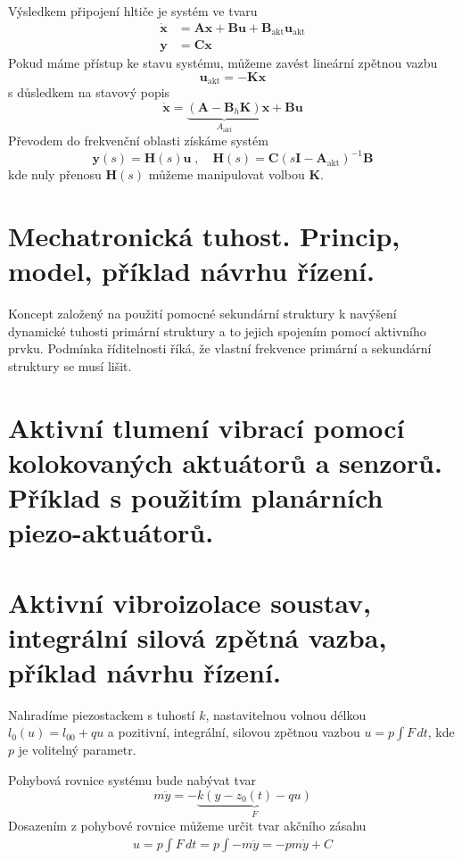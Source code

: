 \documentclass{article}
\begin{document}
	Výsledkem připojení hltiče je systém ve tvaru
	\begin{align}
		\bm{\dot{x}} &= \bm{A}\bm{x} + \bm{B}\bm{u} + \bm{B}_\text{akt} \bm{u}_\text{akt} \\
		\bm{y} &= \bm{C}\bm{x}
	\end{align}
	Pokud máme přístup ke stavu systému, můžeme zavést lineární zpětnou vazbu
	\begin{equation}
		\bm{u}_\text{akt} = -\bm{K}\bm{x}
	\end{equation}
	s důsledkem na stavový popis
	\begin{equation}
		\bm{\dot{x}} = \underbrace{(\bm{A}-\bm{B}_h\bm{K})}_{A_\text{akt}}\bm{x} + \bm{B}\bm{u}
	\end{equation}
	Převodem do frekvenční oblasti získáme systém
	\begin{equation}
	\bm{y}(s) = \bm{H}(s)\bm{u}
	\;,\quad 
	\bm{H}(s) = \bm{C}(s\bm{I}-\bm{A}_\text{akt})^{-1}\bm{B}
	\end{equation}
	kde nuly přenosu $\bm{H}(s)$ můžeme manipulovat volbou $\bm{K}$.

	\section{Mechatronická tuhost. Princip, model, příklad návrhu řízení.}

	Koncept založený na použití pomocné sekundární struktury k navýšení dynamické tuhosti primární struktury a to jejich spojením pomocí aktivního prvku. Podmínka říditelnosti říká, že vlastní frekvence primární a sekundární struktury se musí lišit.

	\section{Aktivní tlumení vibrací pomocí kolokovaných aktuátorů a senzorů. Příklad s použitím planárních piezo-aktuátorů.}

	\section{Aktivní vibroizolace soustav, integrální silová zpětná vazba, příklad návrhu řízení.}

	Nahradíme piezostackem s tuhostí $k$, nastavitelnou volnou délkou $l_0(u) = l_{00} + qu$ a pozitivní, integrální, silovou zpětnou vazbou $u = p \int F\,dt$, kde $p$ je volitelný parametr.

	Pohybová rovnice systému bude nabývat tvar
	\begin{equation}
		m\ddot{y} = - \underbrace{k ( y-z_0(t)-qu)}_{F}
	\end{equation}
	Dosazením z pohybové rovnice můžeme určit tvar akčního zásahu
	\begin{align}
		u = p \int F\,dt = p \int -m\ddot{y} = -pm\dot{y} + C
	\end{align}
\end{document}

